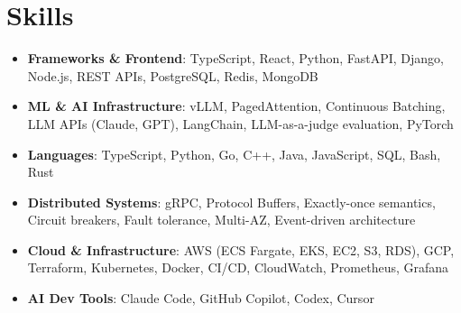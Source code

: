 \documentclass[letterpaper,11pt]{article}
\newcommand{\resumeSubHeadingListStart}{\begin{itemize}[leftmargin=0.15in, label={}]}
\newcommand{\resumeSubHeadingListEnd}{\end{itemize}}
\newcommand{\resumeSkillHeading}[2]{%
  \item\small{\textbf{#1}: #2 \vspace{-9pt}}%
}
\begin{document}
\section{Skills}
  \resumeSubHeadingListStart
    \resumeSkillHeading{Frameworks \& Frontend}{TypeScript, React, Python, FastAPI, Django, Node.js, REST APIs, PostgreSQL, Redis, MongoDB}
    \resumeSkillHeading{ML \& AI Infrastructure}{vLLM, PagedAttention, Continuous Batching, LLM APIs (Claude, GPT), LangChain, LLM-as-a-judge evaluation, PyTorch}
    \resumeSkillHeading{Languages}{TypeScript, Python, Go, C++, Java, JavaScript, SQL, Bash, Rust}
    \resumeSkillHeading{Distributed Systems}{gRPC, Protocol Buffers, Exactly-once semantics, Circuit breakers, Fault tolerance, Multi-AZ, Event-driven architecture}
    \resumeSkillHeading{Cloud \& Infrastructure}{AWS (ECS Fargate, EKS, EC2, S3, RDS), GCP, Terraform, Kubernetes, Docker, CI/CD, CloudWatch, Prometheus, Grafana}
    \resumeSkillHeading{AI Dev Tools}{Claude Code, GitHub Copilot, Codex, Cursor}
  \resumeSubHeadingListEnd
\end{document}
